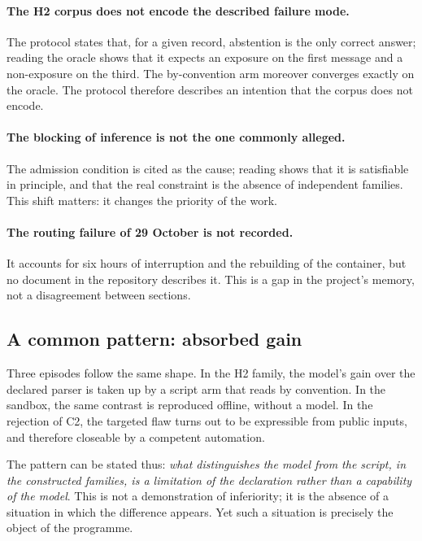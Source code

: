 \paragraph{The H2 corpus does not encode the described failure mode.} The protocol states that, for a given record, abstention is the only correct answer; reading the oracle shows that it expects an exposure on the first message and a non-exposure on the third. The by-convention arm moreover converges exactly on the oracle. The protocol therefore describes an intention that the corpus does not encode.

\paragraph{The blocking of inference is not the one commonly alleged.} The admission condition is cited as the cause; reading shows that it is satisfiable in principle, and that the real constraint is the absence of independent families. This shift matters: it changes the priority of the work.

\paragraph{The routing failure of 29 October is not recorded.} It accounts for six hours of interruption and the rebuilding of the container, but no document in the repository describes it. This is a gap in the project's memory, not a disagreement between sections.

\subsection{A common pattern: absorbed gain}

Three episodes follow the same shape. In the H2 family, the model's gain over the declared parser is taken up by a script arm that reads by convention. In the sandbox, the same contrast is reproduced offline, without a model. In the rejection of C2, the targeted flaw turns out to be expressible from public inputs, and therefore closeable by a competent automation.

The pattern can be stated thus: \emph{what distinguishes the model from the script, in the constructed families, is a limitation of the declaration rather than a capability of the model}. This is not a demonstration of inferiority; it is the absence of a situation in which the difference appears. Yet such a situation is precisely the object of the programme.

